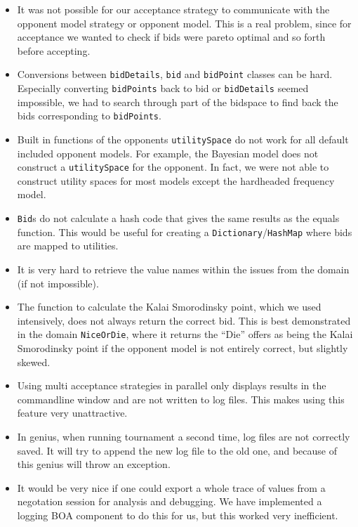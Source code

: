 \begin{itemize}
\item It was not possible for our acceptance strategy to communicate with the 
opponent model strategy or opponent model. This is a real problem, 
since for acceptance we wanted to check if bids were pareto optimal and so forth
before accepting.
\item Conversions between \verb-bidDetails-, \verb-bid- and \verb-bidPoint- classes can be hard. Especially 
converting \verb-bidPoints- back to bid or \verb-bidDetails- seemed impossible, we had to search through
part of the bidspace to find back the bids corresponding to \verb-bidPoints-.
\item Built in functions of the opponents \verb-utilitySpace- do not work for all default included 
opponent models. For example, the Bayesian model does not construct a \verb-utilitySpace- for the opponent. 
In fact, we were not able to construct utility spaces for most models except the hardheaded frequency model. 
\item \verb-Bid-s do not calculate a hash code that gives the same results as the equals function. This would 
be useful for creating a \verb-Dictionary-/\verb-HashMap- where bids are mapped to utilities.
\item It is very hard to retrieve the value names within the issues from the domain (if not impossible).
\item The function to calculate the Kalai Smorodinsky point, which we used intensively,
does not always return the correct bid. This is best demonstrated in the domain 
\verb-NiceOrDie-, where it returns the ``Die'' offers as being the Kalai Smorodinsky point if the opponent model
is not entirely correct, but slightly skewed.
\item Using multi acceptance strategies in parallel only displays results in the commandline window and are not written to log files. This makes using this feature very unattractive.
\item In genius, when running tournament a second time, log files are not correctly saved.
It will try to append the new log file to the old one, and because of this genius will throw
an exception. 
\item It would be very nice if one could export a whole trace of values from a negotation
session for analysis and debugging. We have implemented a logging BOA component to do this for us, but this worked very inefficient.
\end{itemize}

